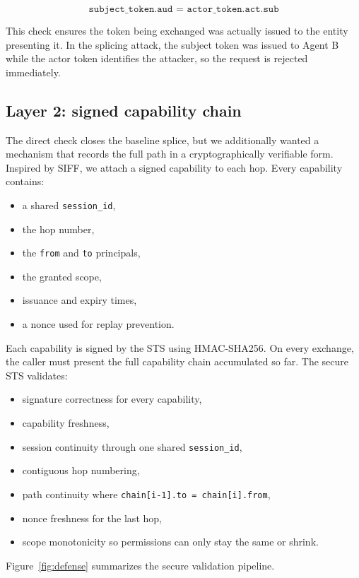 \documentclass[11pt]{article}
\begin{document}
\[
\texttt{subject\_token.aud = actor\_token.act.sub}
\]

This check ensures the token being exchanged was actually issued to the entity presenting it. In the splicing attack, the subject token was issued to Agent B while the actor token identifies the attacker, so the request is rejected immediately.

\subsection{Layer 2: signed capability chain}
The direct check closes the baseline splice, but we additionally wanted a mechanism that records the full path in a cryptographically verifiable form. Inspired by SIFF, we attach a signed capability to each hop. Every capability contains:

\begin{itemize}
  \item a shared \texttt{session\_id},
  \item the hop number,
  \item the \texttt{from} and \texttt{to} principals,
  \item the granted scope,
  \item issuance and expiry times,
  \item a nonce used for replay prevention.
\end{itemize}

Each capability is signed by the STS using HMAC-SHA256. On every exchange, the caller must present the full capability chain accumulated so far. The secure STS validates:

\begin{itemize}
  \item signature correctness for every capability,
  \item capability freshness,
  \item session continuity through one shared \texttt{session\_id},
  \item contiguous hop numbering,
  \item path continuity where \texttt{chain[i-1].to = chain[i].from},
  \item nonce freshness for the last hop,
  \item scope monotonicity so permissions can only stay the same or shrink.
\end{itemize}

Figure~\ref{fig:defense} summarizes the secure validation pipeline.
\end{document}
